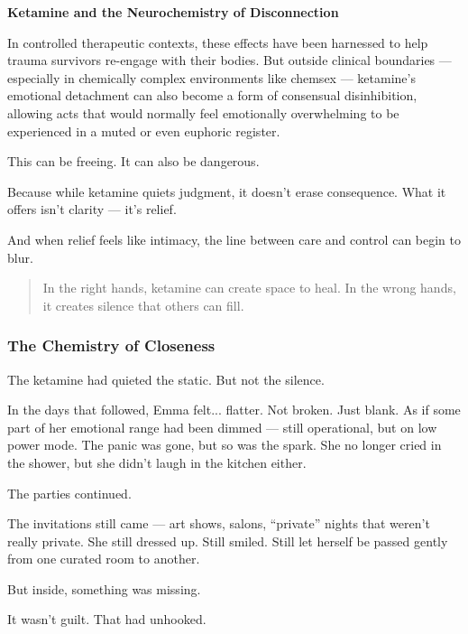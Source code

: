 \begin{TechnicalSidebar}{\textbf{Ketamine and the Neurochemistry of Disconnection}}
  \medskip
  
  In controlled therapeutic contexts, these effects have been harnessed to help trauma survivors re-engage 
  with their bodies. But outside clinical boundaries — especially in chemically complex environments like 
  chemsex — ketamine’s emotional detachment can also become a form of consensual disinhibition, allowing 
  acts that would normally feel emotionally overwhelming to be experienced in a muted or even euphoric 
  register.
  
  \medskip
  
  This can be freeing.
  It can also be dangerous.

  \medskip
  
  Because while ketamine quiets judgment, it doesn’t erase consequence. What it offers isn’t clarity 
  — it’s relief.

  \medskip
  
  And when relief feels like intimacy, the line between care and control can begin to blur.
  
  \begin{quote}
    In the right hands, ketamine can create space to heal.  
    In the wrong hands, it creates silence that others can fill.
  \end{quote}
  
\end{TechnicalSidebar}

\subsubsection{The Chemistry of Closeness}

The ketamine had quieted the static. But not the silence.

In the days that followed, Emma felt... flatter. Not broken. Just blank. As if some part of her emotional 
range had been dimmed — still operational, but on low power mode. The panic was gone, but so was the 
spark. She no longer cried in the shower, but she didn’t laugh in the kitchen either.

The parties continued.

The invitations still came — art shows, salons, “private” nights that weren’t really private. She still 
dressed up. Still smiled. Still let herself be passed gently from one curated room to another.

But inside, something was missing.

It wasn’t guilt. That had unhooked.

